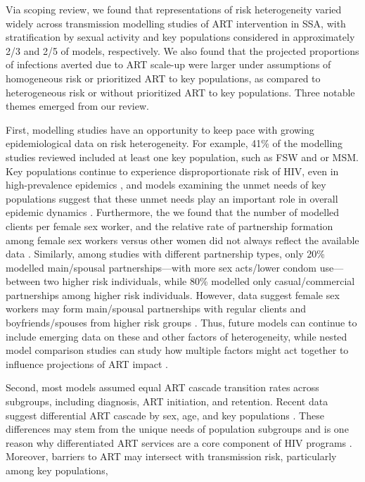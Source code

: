 Via scoping review, we found that representations of risk heterogeneity varied widely across
transmission modelling studies of ART intervention in SSA, with
stratification by sexual activity and key populations considered in approximately
2/3 and 2/5 of models, respectively.
We also found that the projected proportions of infections averted due to ART scale-up were
larger under assumptions of homogeneous risk or prioritized ART to key populations,
as compared to heterogeneous risk or without prioritized ART to key populations.
Three notable themes emerged from our review.
\par
First, modelling studies have an opportunity to keep pace with growing epidemiological data on risk heterogeneity.
For example, 41\% of the modelling studies reviewed included at least one key population, such as FSW and or MSM.
Key populations continue to experience disproportionate risk of HIV, even in high-prevalence epidemics \cite{AIDSinfo},
and models examining the unmet needs of key populations suggest that
these unmet needs play an important role in overall epidemic dynamics \cite{Stone2021,Bekker2015}.
Furthermore, the we found that the number of modelled clients per female sex worker, and
the relative rate of partnership formation among female sex workers versus other women
did not always reflect the available data \cite{Watts2010,Scorgie2012}.
Similarly, among studies with different partnership types, only 20\% modelled
main/spousal partnerships---with more sex acts/lower condom use---between two higher risk individuals,
while 80\% modelled only casual/commercial partnerships among higher risk individuals.
However, data suggest female sex workers may form main/spousal partnerships
with regular clients and boyfriends/spouses from higher risk groups \cite{Scorgie2012}.
Thus, future models can continue to include emerging data on these and other factors of heterogeneity,
while nested model comparison studies can study how
multiple factors might act together to influence projections of ART impact \cite{Dodd2010,Hontelez2013}.
\par
Second, most models assumed equal ART cascade transition rates across subgroups,
including diagnosis, ART initiation, and retention.
Recent data suggest differential ART cascade by sex, age, and key populations
\cite{Lancaster2016,Schwartz2017,Ma2020,Green2020}.
These differences may stem from the unique needs of population subgroups
and is one reason why differentiated ART services are a core component of HIV programs
\cite{Chikwari2018,Ehrenkranz2019}.
Moreover, barriers to ART may intersect with transmission risk, particularly among key populations,
